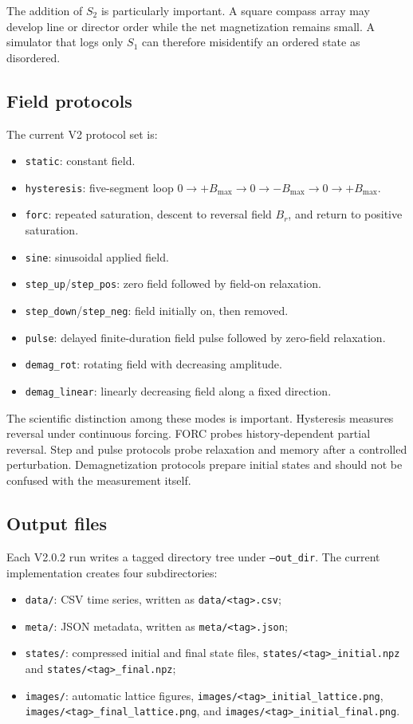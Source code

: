 \documentclass[11pt,a4paper]{article}
\newcommand{\code}[1]{\texttt{#1}}
\begin{document}
The addition of $S_2$ is particularly important. A square compass array may develop line or director order while the net magnetization remains small. A simulator that logs only $S_1$ can therefore misidentify an ordered state as disordered.

\subsection{Field protocols}

The current V2 protocol set is:
\begin{itemize}[leftmargin=*]
\item \code{static}: constant field.
\item \code{hysteresis}: five-segment loop $0\to +B_{\max}\to0\to-B_{\max}\to0\to+B_{\max}$.
\item \code{forc}: repeated saturation, descent to reversal field $B_r$, and return to positive saturation.
\item \code{sine}: sinusoidal applied field.
\item \code{step\_up}/\code{step\_pos}: zero field followed by field-on relaxation.
\item \code{step\_down}/\code{step\_neg}: field initially on, then removed.
\item \code{pulse}: delayed finite-duration field pulse followed by zero-field relaxation.
\item \code{demag\_rot}: rotating field with decreasing amplitude.
\item \code{demag\_linear}: linearly decreasing field along a fixed direction.
\end{itemize}

The scientific distinction among these modes is important. Hysteresis measures reversal under continuous forcing. FORC probes history-dependent partial reversal. Step and pulse protocols probe relaxation and memory after a controlled perturbation. Demagnetization protocols prepare initial states and should not be confused with the measurement itself.


\subsection{Output files}

Each V2.0.2 run writes a tagged directory tree under \code{--out\_dir}. The current implementation creates four subdirectories:
\begin{itemize}[leftmargin=*]
\item \code{data/}: CSV time series, written as \code{data/<tag>.csv};
\item \code{meta/}: JSON metadata, written as \code{meta/<tag>.json};
\item \code{states/}: compressed initial and final state files, \code{states/<tag>\_initial.npz} and \code{states/<tag>\_final.npz};
\item \code{images/}: automatic lattice figures, \code{images/<tag>\_initial\_lattice.png}, \code{images/<tag>\_final\_lattice.png}, and \code{images/<tag>\_initial\_final.png}.
\end{itemize}
\end{document}
